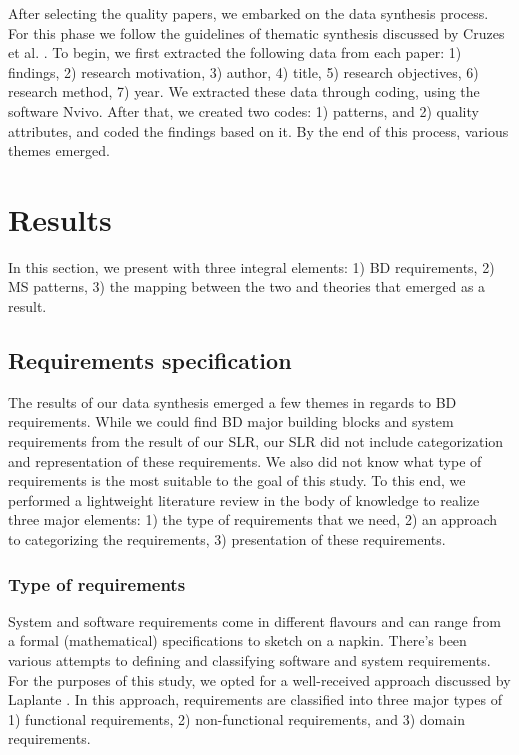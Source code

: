 \documentclass[a4paper,11pt,article,oneside]{memoir}
\begin{document}
After selecting the quality papers, we embarked on the data synthesis process. For this phase we follow the guidelines of thematic synthesis discussed by Cruzes et al. \cite{Cruzes.2011}. To begin, we first extracted the following data from each paper: 1) findings, 2) research motivation, 3) author, 4) title, 5) research objectives, 6) research method, 7) year. We extracted these data through coding, using the software Nvivo. After that, we created two codes: 1) patterns, and 2) quality attributes, and coded the findings based on it. By the end of this process, various themes emerged. 





\chapter{Results}

In this section, we present with three integral elements: 1) BD requirements, 2) MS patterns, 3) the mapping between the two and theories that emerged as a result.  

\section{Requirements specification}

The results of our data synthesis emerged a few themes in regards to BD requirements. While we could find BD major building blocks and system requirements from the result of our SLR, our SLR did not include categorization and representation of these requirements. We also did not know what type of requirements is the most suitable to the goal of this study. To this end, we performed a lightweight literature review in the body of knowledge to realize three major elements: 1) the type of requirements that we need, 2) an approach to categorizing the requirements, 3) presentation of these requirements. 

\subsection{Type of requirements}
System and software requirements come in different flavours and can range from a formal (mathematical) specifications to sketch on a napkin. There's been various attempts to defining and classifying software and system requirements. For the purposes of this study, we opted for a well-received approach discussed by Laplante \cite{laplante2017requirements}. In this approach, requirements are classified into three major types of 1) functional requirements, 2) non-functional requirements, and 3) domain requirements. 
\end{document}
